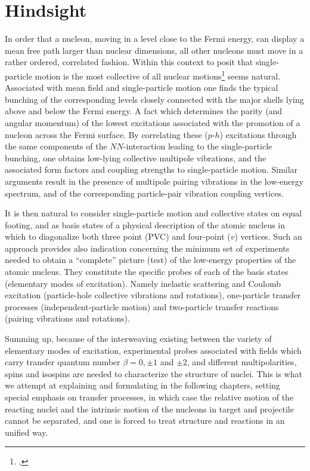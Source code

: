 \section{Hindsight}\label{Sect1.10}
In order that a nucleon, moving in a level close to the Fermi energy, can display a mean free path larger than nuclear dimensions,  all other nucleons must move in a rather ordered, correlated fashion. Within this context to posit that single-particle motion is the most collective of all nuclear motions\footnote{\cite{Mottelson:62},} seems natural. Associated with mean field and single-particle motion one finds the typical bunching of the corresponding levels closely connected with the major shells lying above and below the Fermi energy. A fact which determines the parity (and angular momentum) of the lowest excitations associated with the promotion of  a nucleon across the Fermi surface.  By correlating these ($p$-$h$) excitations through the same components of the $NN$-interaction leading to the single-particle bunching, one obtains low-lying collective multipole  vibrations, and the associated form factors and coupling strengths to single-particle motion. Similar arguments result in the presence of multipole pairing vibrations in the low-energy spectrum, and of the corresponding particle-pair vibration coupling vertices.

It is then natural to consider single-particle motion  and collective states on equal footing, and as basis states of a physical description of the atomic nucleus in which to diagonalize both three point  (PVC) and four-point ($v$) vertices. Such an approach  provides also  indication concerning the minimum set of experiments needed to obtain a ``complete'' picture (test)  of the low-energy properties  of the atomic nucleus. They constitute the specific probes of each of the basis states (elementary modes of excitation). Namely inelastic scattering and Coulomb excitation (particle-hole collective vibrations and rotations), one-particle transfer processes (independent-particle motion) and two-particle transfer reactions (pairing vibrations and rotations). 


Summing up, because of the interweaving existing between the variety of elementary modes of excitation, experimental probes associated with fields which carry transfer quantum number $\beta=0, \pm 1$ and $\pm2$, and different multipolarities, spins and isospins are needed to characterize the structure of nuclei. This is what we attempt at explaining and formulating in the following chapters, setting special emphasis on transfer processes, in which case the relative motion of the reacting nuclei and the intrinsic motion of the nucleons in target and projectile cannot be separated, and one is forced to treat structure and reactions in an unified way.









%

%
